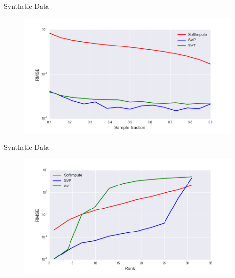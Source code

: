 \documentclass{beamer}
\begin{document}
\begin{frame}{Synthetic Data}
	\begin{figure}[h]
		\centering
		\includegraphics[width=1\linewidth]{./../results/synthetic/exper_1/synthetic_nsamp_rmse.png}
		\label{heat_map}
	\end{figure}
\end{frame}
\begin{frame}{Synthetic Data}
	\begin{figure}[h]
		\centering
		\includegraphics[width=1\linewidth]{./../results/synthetic/exper_2/synthetic_rank_rmse.png}
		\label{heat_map}
	\end{figure}
\end{frame}
\end{document}
